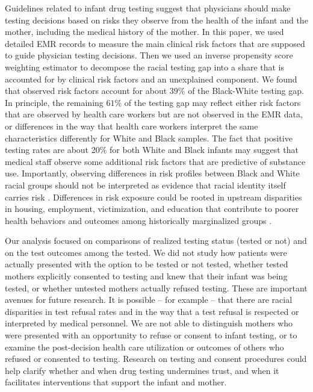 Guidelines related to infant drug testing suggest that physicians should make testing decisions based on risks they observe from the health of the infant and the mother, including the medical history of the mother. In this paper, we used detailed EMR records to measure the main clinical risk factors that are supposed to guide physician testing decisions. Then we used an inverse propensity score weighting estimator to decompose the racial testing gap into a share that is accounted for by clinical risk factors and an unexplained component. We found that observed risk factors account for about $39\%$ of the Black-White testing gap. In principle, the remaining $61\%$ of the testing gap may reflect either risk factors that are observed by health care workers but are not observed in the EMR data, or differences in the way that health care workers interpret the same characteristics differently for White and Black samples. The fact that positive testing rates are about 20\% for both White and Black infants may suggest that medical staff observe some additional risk factors that are predictive of substance use. Importantly, observing differences in risk profiles between Black and White racial groups should not be interpreted as evidence that racial identity itself carries risk \citep{chokshi2022act}. Differences in risk exposure could be rooted in upstream disparities in housing, employment, victimization, and education that contribute to poorer health behaviors and outcomes among historically marginalized groups \citep{yearby2022structural}. 

Our analysis focused on comparisons of realized testing status (tested or not) and on the test outcomes among the tested. We did not study how patients were actually presented with the option to be tested or not tested, whether tested mothers explicitly consented to testing and knew that their infant was being tested, or whether untested mothers actually refused testing. These are important avenues for future research. It is possible -- for example -- that there are racial disparities in test refusal rates and in the way that a test refusal is respected or interpreted by medical personnel. We are not able to distinguish mothers who were presented with an opportunity to refuse or consent to infant testing, or to examine the post-decision health care utilization or outcomes of others who refused or consented to testing. Research on testing and consent procedures could help clarify whether and when drug testing undermines trust, and when it facilitates interventions that support the infant and mother. 

